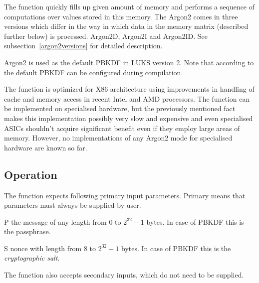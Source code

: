 \documentclass[nolof]{fithesis3}
\begin{document}
The function quickly fills up given amount of memory and performs a sequence of computations over values stored in this memory. The Argon2 comes in three versions which differ in the way in which data in the memory matrix (described further below) is processed. Argon2D, Argon2I and Argon2ID. See subsection~\ref{argon2versions} for detailed description.

Argon2 is used as the default PBKDF in LUKS version 2. Note that according to \parencite{cryptsetupmanual} the default PBKDF can be configured during compilation.

The function is optimized for X86 architecture using improvements in handling of cache and memory access in recent Intel and AMD processors. The function can be implemented on specialised hardware, but the previously mentioned fact makes this implementation possibly very slow and expensive and even specialised ASICs shouldn't acquire significant benefit even if they employ large areas of memory. However, no implementations of any Argon2 mode for specialised hardware are known so far.

\subsection{Operation}
The function expects following primary input parameters. Primary means that parameters must always be supplied by user.

\begin{description}
\item{P} the message of any length from 0 to \(2^{32} - 1\) bytes. In case of PBKDF this is the passphrase.

\item{S} nonce with length from 8 to \(2^{32} - 1\) bytes. In case of PBKDF this is the \emph{cryptographic salt}.
\end{description}

The function also accepts secondary inputs, which do not need to be supplied.
\end{document}

